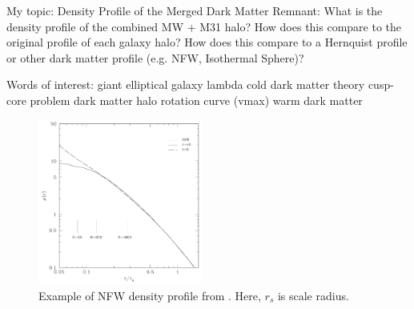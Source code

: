 My topic: Density Profile of the Merged Dark Matter Remnant:
What is the density profile of the combined MW + M31 halo? How does this compare to the original profile of each galaxy halo? How does this compare to a Hernquist profile or other dark matter profile (e.g. NFW, Isothermal Sphere)?


Words of interest:
giant elliptical galaxy
lambda cold dark matter theory
cusp-core problem
dark matter halo
rotation curve (vmax)
warm dark matter

\begin{figure}
  \begin{center}
    \includegraphics[width=0.48\textwidth]{Figures/NFWdensprof.png}
  \end{center}
  \caption{Example of NFW density profile from \cite{Prada2013}. Here, $r_{s}$ is scale radius.}
  \label{NFW prof graph}
\end{figure}